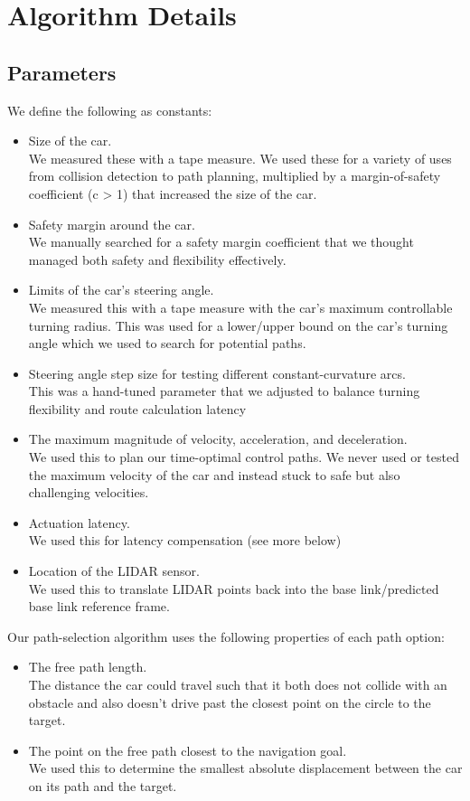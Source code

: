 \documentclass[11pt]{article}
\begin{document}
\section{Algorithm Details}

\subsection{Parameters}

We define the following as constants:
\begin{itemize}
    \item Size of the car.
    \\ We measured these with a tape measure. We used these for a variety of
    uses from collision detection to path planning, multiplied by a
    margin-of-safety coefficient (c > 1) that increased the size of the car.
    \item Safety margin around the car.
    \\ We manually searched for a safety margin  coefficient that we thought
    managed both safety and flexibility effectively.
    \item Limits of the car's steering angle.
    \\ We measured this with a tape measure with the car's maximum controllable
    turning radius. This was used for a lower/upper bound on the car's turning
    angle which we used to search for potential paths.
    \item Steering angle step size for testing different constant-curvature arcs.
    \\ This was a hand-tuned parameter that we adjusted to balance turning
    flexibility and route calculation latency
    \item The maximum magnitude of velocity, acceleration, and deceleration.
    \\ We used this to plan our time-optimal control paths. We never used or
    tested the maximum velocity of the car and instead stuck to safe but also
    challenging velocities.
    \item Actuation latency.
    \\ We used this for latency compensation (see more below)
    \item Location of the LIDAR sensor.
    \\ We used this to translate LIDAR points back into the base link/predicted
    base link reference frame.
\end{itemize}

Our path-selection algorithm uses the following properties of each path option:
\begin{itemize}
    \item The free path length.
    \\ The distance the car could travel such that it both does not collide with
    an obstacle and also doesn't drive past the closest point on the circle to
    the target.
    \item The point on the free path closest to the navigation goal.
    \\ We used this to determine the smallest absolute displacement between the
    car on its path and the target.
\end{itemize}
\end{document}
